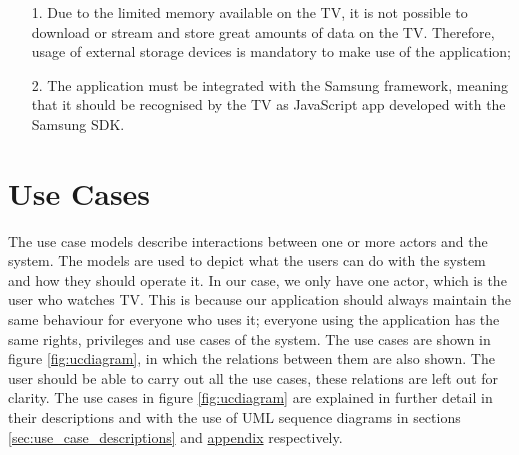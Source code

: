 \begin{itemize}
\item[1.] Due to the limited memory available on the TV, it is not
possible to download or stream and store great amounts of data on the TV.
Therefore, usage of external storage devices is mandatory to make use
of the application;

\item[2.] The application must be integrated with the Samsung
framework, meaning that it should be recognised by the TV as
JavaScript app developed with the Samsung SDK.
\end{itemize}

\section{Use Cases}
\label{sec:use_cases}
The use case models describe interactions between one or more actors and the system.
The models are used to depict what the users can do with the system and how they  should operate it.
In our case, we only have one actor, which is the user who watches TV. This is because our application should always
maintain the same behaviour for everyone who uses it; everyone using the application has the same rights, privileges
and use cases of the system. The use cases are shown in figure \ref{fig:ucdiagram},
in which the relations between them are also shown. The user should be able to carry out all the use cases,
these relations are left out for clarity. The use cases in figure \ref{fig:ucdiagram}
are explained in further detail in their descriptions and with the use of UML sequence diagrams in sections
\hyperref[sec:use_case_descriptions]{\ref*{sec:use_case_descriptions}} and
\hyperref[sec:req_dynamic_models]{appendix} respectively.

